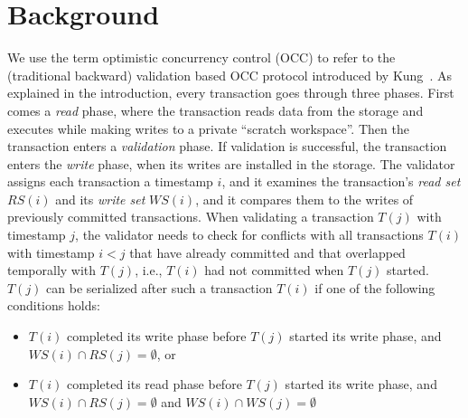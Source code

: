 \section{Background}\label{sec:background}

We use the term optimistic concurrency control (OCC) to refer to the (traditional backward) validation based OCC protocol introduced by Kung~\cite{kung81tods}.
As explained in the introduction, every transaction goes through three phases. First comes a \emph{read} phase, where the transaction reads data from the storage and executes while making writes to a private ``scratch workspace''. Then the transaction enters a \emph{validation} phase. If validation is successful, the transaction enters the \emph{write} phase, when its writes are installed in the storage. 
The validator assigns each transaction a timestamp $i$, and it examines the transaction's \emph{read set} $RS(i)$ and its \emph{write set} $WS(i)$, and it compares them to the writes of previously committed transactions. 
When validating a transaction $T(j)$ with timestamp $j$, the validator needs to check for conflicts with all transactions $T(i)$ with timestamp $i<j$ that have already committed and that overlapped temporally with $T(j)$, i.e., $T(i)$ had not committed when $T(j)$ started. 
$T(j)$ can be serialized after such a transaction $T(i)$ if one of the following conditions holds:
\begin{itemize}[leftmargin=*]
\item $T(i)$ completed its write phase before $T(j)$ started its write phase, and $WS(i) \cap RS(j) = \emptyset$, or
\item $T(i)$ completed its read phase before $T(j)$ started its write phase, and $WS(i) \cap RS(j) = \emptyset$ and $WS(i) \cap WS(j) = \emptyset$
\end{itemize}
